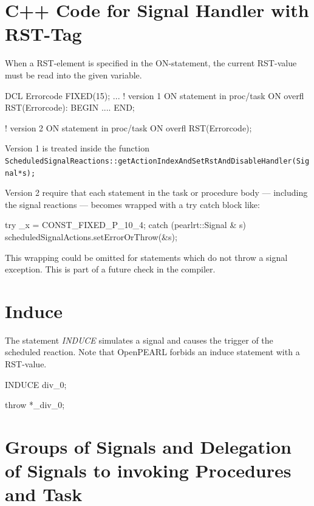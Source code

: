 \section{C++ Code for Signal Handler with RST-Tag}
When a RST-element is specified in the ON-statement, the current
RST-value must be read into the given variable.

\begin{PEARLCode}
DCL Errorcode FIXED(15);
...
   ! version 1  ON statement in proc/task
   ON overfl RST(Errorcode): BEGIN .... END;

   ! version 2  ON statement in proc/task
   ON overfl RST(Errorcode);
\end{PEARLCode}

Version 1 is treated inside the function \verb|ScheduledSignalReactions::getActionIndexAndSetRstAndDisableHandler(Signal*s);|

Version 2 require that each statement in the task or procedure body ---
including the signal reactions --- becomes wrapped with a try catch block like:

\begin{CppCode}
    try {
       _x = CONST_FIXED_P_10_4;
    } catch (pearlrt::Signal & s) {
       scheduledSignalActions.setErrorOrThrow(&s);
    }
\end{CppCode}

This wrapping could be omitted for statements which do not 
throw a signal exception. This is part of a future check in the compiler.


\section{Induce}
The statement {\em INDUCE} simulates a signal and causes the trigger 
of the scheduled reaction.
Note that OpenPEARL forbids an induce statement with a RST-value.


\begin{PEARLCode}
INDUCE div_0;
\end{PEARLCode}

\begin{CppCode}
throw *_div_0;
\end{CppCode}

\section{Groups of Signals and Delegation of Signals to invoking Procedures and Task}


